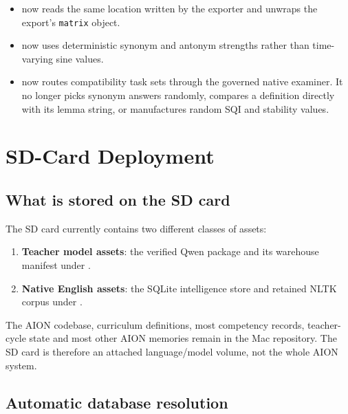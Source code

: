 \documentclass[11pt,a4paper]{article}
\begin{document}
\begin{itemize}
  \item {} now reads the same
         location written by the exporter
        and unwraps the export's \texttt{matrix} object.
  \item {} now uses deterministic
        synonym and antonym strengths rather than time-varying sine values.
  \item {} now
        routes compatibility task sets through the governed native examiner. It no longer
        picks synonym answers randomly, compares a definition directly with its lemma string,
        or manufactures random SQI and stability values.
\end{itemize}

\section{SD-Card Deployment}

\subsection{What is stored on the SD card}

The SD card currently contains two different classes of assets:

\begin{enumerate}
  \item \textbf{Teacher model assets}: the verified Qwen package and its warehouse manifest
        under .
  \item \textbf{Native English assets}: the SQLite intelligence store and retained NLTK corpus
        under .
\end{enumerate}

The AION codebase, curriculum definitions, most competency records, teacher-cycle state and
most other AION memories remain in the Mac repository. The SD card is therefore an attached
language/model volume, not the whole AION system.

\subsection{Automatic database resolution}
\end{document}
